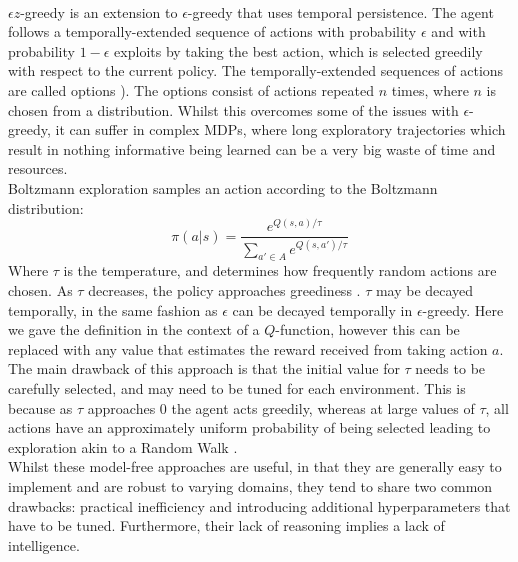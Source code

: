 \\$\epsilon z$-greedy \cite{dabney2021temporallyextended} is an extension to $\epsilon$-greedy that uses temporal persistence. The agent follows a temporally-extended sequence of actions with probability $\epsilon$ and with probability $1-\epsilon$ exploits by taking the best action, which is selected greedily with respect to the current policy. The temporally-extended sequences of actions are called options \cite{SUTTON1999181}). The options consist of actions repeated $n$ times, where $n$ is chosen from a distribution. Whilst this overcomes some of the issues with $\epsilon$-greedy, it can suffer in complex MDPs, where long exploratory trajectories which result in nothing informative being learned can be a very big waste of time and resources.
\\ Boltzmann exploration samples an action according to the Boltzmann distribution:
\begin{equation}
\label{eqn:boltzmann}
\pi(a|s) = \frac{e^{Q(s,a)/\tau}}{\sum_{a' \in A}e^{Q(s,a')/\tau}}
\end{equation}
Where $\tau$ is the temperature, and determines how frequently random actions are chosen. As $\tau$ decreases, the policy approaches greediness \cite{DBLP:journals/corr/cs-AI-9605103, DBLP:journals/corr/abs-2109-00157}. $\tau$ may be decayed temporally, in the same fashion as $\epsilon$ can be decayed temporally in $\epsilon$-greedy. Here we gave the definition in the context of a $Q$-function, however this can be replaced with any value that estimates the reward received from taking action $a$. The main drawback of this approach is that the initial value for $\tau$ needs to be carefully selected, and may need to be tuned for each environment. This is because as $\tau$ approaches 0 the agent acts greedily, whereas at large values of $\tau$, all actions have an approximately uniform probability of being selected leading to exploration akin to a Random Walk \cite{DBLP:journals/corr/abs-2109-00157}.
\\ Whilst these model-free approaches are useful, in that they are generally easy to implement and are robust to varying domains, they tend to share two common drawbacks: practical inefficiency and introducing additional hyperparameters that have to be tuned. Furthermore, their lack of reasoning implies a lack of intelligence.
